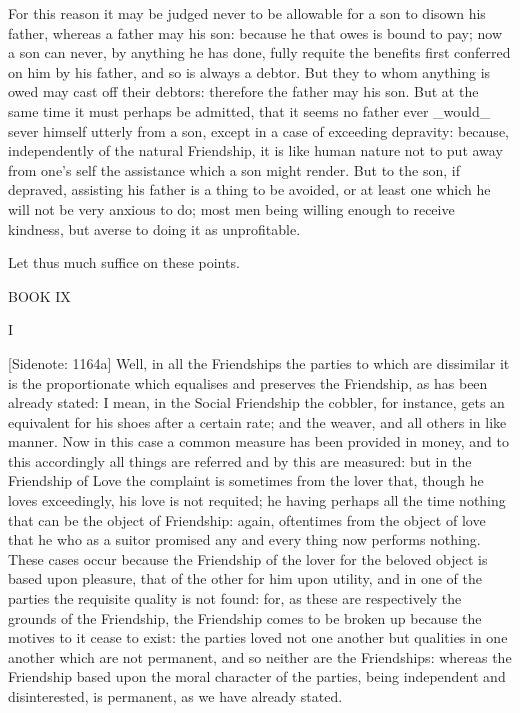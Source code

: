 For this reason it may be judged never to be allowable for a son to
disown his father, whereas a father may his son: because he that owes
is bound to pay; now a son can never, by anything he has done, fully
requite the benefits first conferred on him by his father, and so is
always a debtor. But they to whom anything is owed may cast off their
debtors: therefore the father may his son. But at the same time it must
perhaps be admitted, that it seems no father ever _would_ sever himself
utterly from a son, except in a case of exceeding depravity: because,
independently of the natural Friendship, it is like human nature not to
put away from one's self the assistance which a son might render. But to
the son, if depraved, assisting his father is a thing to be avoided, or
at least one which he will not be very anxious to do; most men
being willing enough to receive kindness, but averse to doing it as
unprofitable.

Let thus much suffice on these points.




BOOK IX


I

[Sidenote: 1164a] Well, in all the Friendships the parties to which are
dissimilar it is the proportionate which equalises and preserves the
Friendship, as has been already stated: I mean, in the Social Friendship
the cobbler, for instance, gets an equivalent for his shoes after a
certain rate; and the weaver, and all others in like manner. Now in
this case a common measure has been provided in money, and to this
accordingly all things are referred and by this are measured: but in
the Friendship of Love the complaint is sometimes from the lover that,
though he loves exceedingly, his love is not requited; he having perhaps
all the time nothing that can be the object of Friendship: again,
oftentimes from the object of love that he who as a suitor promised any
and every thing now performs nothing. These cases occur because the
Friendship of the lover for the beloved object is based upon pleasure,
that of the other for him upon utility, and in one of the parties the
requisite quality is not found: for, as these are respectively the
grounds of the Friendship, the Friendship comes to be broken up because
the motives to it cease to exist: the parties loved not one another but
qualities in one another which are not permanent, and so neither are the
Friendships: whereas the Friendship based upon the moral character of
the parties, being independent and disinterested, is permanent, as we
have already stated.

